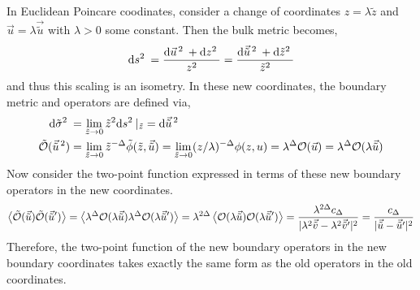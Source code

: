 \documentclass[12pt]{article}
\begin{document}
\subsection{}

In Euclidean Poincare coodinates, consider a change of coordinates $z = \lambda \tilde{z}$ and $\vec{u} = \lambda \vec{\tilde{u}}$ with $\lambda > 0$ some constant. Then the bulk metric becomes,
\[ \mathrm{d}s^2 \: = \frac{\mathrm{d}\vec{u}^{\, 2} \: + \mathrm{d}z^2 \:}{z^2} = \frac{\mathrm{d}\vec{\tilde{u}}^{\, 2} \: + \mathrm{d}\tilde{z}^2 \:}{\tilde{z}^2} \]
and thus this scaling is an isometry. In these new coordinates, the boundary metric and operators are defined via,
\newcommand{\vt}[1]{\vec{\tilde{#1}}}
\newcommand{\vts}[1]{\vec{\tilde{#1}}^{\, 2}}
\begin{align*}
\d{\tilde{\sigma}^2} & = \lim_{\tilde{z} \to 0} \tilde{z}^2 \d{s^2}|_{\tilde{z}} = \d{\vec{\tilde{u}}^{\, 2}}
\\
\tilde{\Op}(\vts{u}) & = \lim_{\tilde{z} \to 0} \tilde{z}^{-\Delta} \tilde{\phi}(\tilde{z}, \vt{u}) = \lim_{\tilde{z} \to 0} (z / \lambda)^{-\Delta} \phi(z, u) = \lambda^\Delta \Op(\vec{u}) = \lambda^\Delta \Op(\lambda \vt{u})
\end{align*}
Now consider the two-point function expressed in terms of these new boundary operators in the new coordinates.
\begin{align*}
\EV{\tilde{\Op}(\vt{u}) \tilde{\Op}(\vt{u}')} = \EV{\lambda^\Delta \Op(\lambda \vt{u}) \lambda^{\Delta} \Op(\lambda \vt{u}')} = \lambda^{2 \Delta} \EV{\Op(\lambda \vt{u})  \Op(\lambda \vt{u}')} = \frac{\lambda^{2 \Delta} c_\Delta}{|\lambda^2 \vt{v} - \lambda^2 \vt{v}'|^2} = \frac{c_\Delta}{|\vt{u} - \vt{u}'|^2}
\end{align*}
Therefore, the two-point function of the new boundary operators in the new boundary coordinates takes exactly the same form as the old operators in the old coordinates.

\subsection{}
\end{document}
